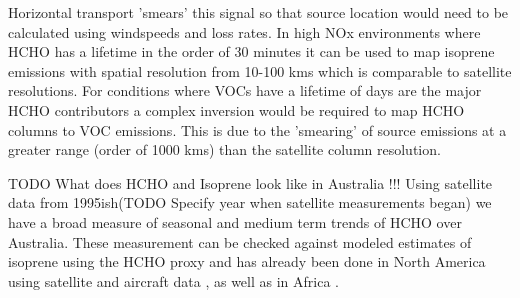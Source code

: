 Horizontal transport 'smears' this signal so that source location would need to be calculated using windspeeds and loss rates.
In high NOx environments where HCHO has a lifetime in the order of 30 minutes it can be used to map isoprene emissions with spatial resolution from 10-100 kms which is comparable to satellite resolutions.
For conditions where VOCs have a lifetime of days are the major HCHO contributors a complex inversion would be required to map HCHO columns to VOC emissions.
This is due to the 'smearing' of source emissions at a greater range (order of 1000 kms) than the satellite column resolution.

TODO What does HCHO and Isoprene look like in Australia !!!
Using satellite data from 1995ish(TODO Specify year when satellite measurements began) we have a broad measure of seasonal and medium term trends of HCHO over Australia.
These measurement can be checked against modeled estimates of isoprene using the HCHO proxy and has already been done in North America using satellite and aircraft data \cite{Millet_2006}, as well as in Africa \cite{Marais_2014}.